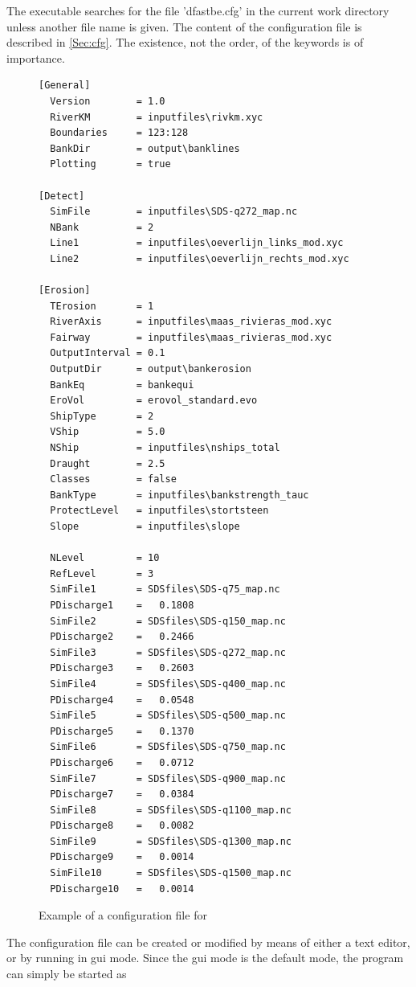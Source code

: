 The executable searches for the file 'dfastbe.cfg' in the current work directory unless another file name is given.
The content of the configuration file is described in \autoref{Sec:cfg}.
The existence, not the order, of the keywords is of importance.

\begin{figure}
\begin{verbatim}
[General]
  Version        = 1.0
  RiverKM        = inputfiles\rivkm.xyc
  Boundaries     = 123:128
  BankDir        = output\banklines
  Plotting       = true

[Detect]
  SimFile        = inputfiles\SDS-q272_map.nc
  NBank          = 2
  Line1          = inputfiles\oeverlijn_links_mod.xyc
  Line2          = inputfiles\oeverlijn_rechts_mod.xyc

[Erosion]
  TErosion       = 1
  RiverAxis      = inputfiles\maas_rivieras_mod.xyc
  Fairway        = inputfiles\maas_rivieras_mod.xyc
  OutputInterval = 0.1
  OutputDir      = output\bankerosion
  BankEq         = bankequi
  EroVol         = erovol_standard.evo
  ShipType       = 2
  VShip          = 5.0
  NShip          = inputfiles\nships_total
  Draught        = 2.5
  Classes        = false
  BankType       = inputfiles\bankstrength_tauc
  ProtectLevel   = inputfiles\stortsteen
  Slope          = inputfiles\slope

  NLevel         = 10
  RefLevel       = 3
  SimFile1       = SDSfiles\SDS-q75_map.nc
  PDischarge1    =   0.1808
  SimFile2       = SDSfiles\SDS-q150_map.nc
  PDischarge2    =   0.2466
  SimFile3       = SDSfiles\SDS-q272_map.nc
  PDischarge3    =   0.2603
  SimFile4       = SDSfiles\SDS-q400_map.nc
  PDischarge4    =   0.0548
  SimFile5       = SDSfiles\SDS-q500_map.nc
  PDischarge5    =   0.1370
  SimFile6       = SDSfiles\SDS-q750_map.nc
  PDischarge6    =   0.0712
  SimFile7       = SDSfiles\SDS-q900_map.nc
  PDischarge7    =   0.0384
  SimFile8       = SDSfiles\SDS-q1100_map.nc
  PDischarge8    =   0.0082
  SimFile9       = SDSfiles\SDS-q1300_map.nc
  PDischarge9    =   0.0014
  SimFile10      = SDSfiles\SDS-q1500_map.nc
  PDischarge10   =   0.0014
\end{verbatim}
\caption{Example of a configuration file for \dfastbe}
\label{Fig2.1}
\end{figure}

The configuration file can be created or modified by means of either a text editor, or by \dfastbe running in gui mode.
Since the gui mode is the default mode, the program can simply be started as

